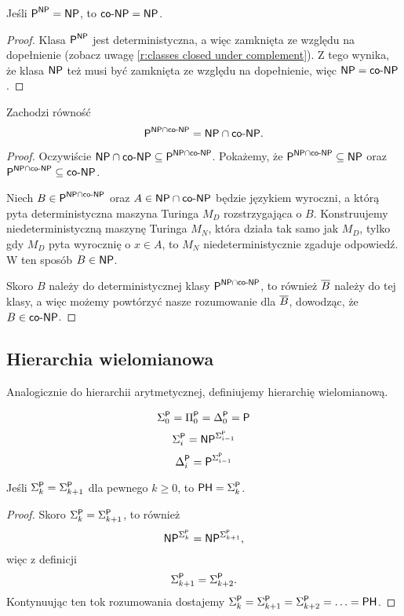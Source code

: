 \begin{fact}
    Jeśli $\textsf{P}^{\textsf{NP}} = \textsf{NP}$, to $\textsf{co-NP} = \textsf{NP}$.
\end{fact}
\begin{proof}
    Klasa $\textsf{P}^{\textsf{NP}}$ jest deterministyczna, a więc zamknięta ze względu na dopełnienie (zobacz uwagę \ref{r:classes closed under complement}). Z tego wynika, że klasa $\textsf{NP}$ też musi być zamknięta ze względu na dopełnienie, więc $\textsf{NP} = \textsf{co-NP}$.
\end{proof}

\begin{fact}
    Zachodzi równość
    \[ \textsf{P}^{\textsf{NP} \cap \textsf{co-NP}} = \textsf{NP} \cap \textsf{co-NP}. \]
\end{fact}
\begin{proof}
    Oczywiście $\textsf{NP} \cap \textsf{co-NP} \subseteq \textsf{P}^{\textsf{NP} \cap \textsf{co-NP}}$. Pokażemy, że $\textsf{P}^{\textsf{NP} \cap \textsf{co-NP}} \subseteq \textsf{NP}$ oraz $\textsf{P}^{\textsf{NP} \cap \textsf{co-NP}} \subseteq \textsf{co-NP}$.

    Niech $B \in \textsf{P}^{\textsf{NP} \cap \textsf{co-NP}}$ oraz $A \in \textsf{NP} \cap \textsf{co-NP}$ będzie językiem wyroczni, a którą pyta deterministyczna maszyna Turinga $M_D$ rozstrzygająca o $B$. Konstruujemy niedeterministyczną maszynę Turinga $M_N$, która działa tak samo jak $M_D$, tylko gdy $M_D$ pyta wyrocznię o $x \in A$, to $M_N$ niedeterministycznie zgaduje odpowiedź. W ten sposób $B \in \textsf{NP}$.

    Skoro $B$ należy do deterministycznej klasy $\textsf{P}^{\textsf{NP} \cap \textsf{co-NP}}$, to również $\overline{B}$ należy do tej klasy, a więc możemy powtórzyć nasze rozumowanie dla $\overline{B}$, dowodząc, że $B \in \textsf{co-NP}$.
\end{proof}

\subsection{Hierarchia wielomianowa}

Analogicznie do hierarchii arytmetycznej, definiujemy hierarchię wielomianową.

\begin{definition}
    \[ \Sigma_0^{\textsf{P}} = \Pi_0^{\textsf{P}} = \Delta_0^{\textsf{P}} = \textsf{P} \]
    \[ \Sigma_i^{\textsf{P}} = \textsf{NP}^{\Sigma_{i-1}^{\textsf{P}}} \]
    \[ \Delta_i^{\textsf{P}} = \textsf{P}^{\Sigma_{i-1}^{\textsf{P}}} \]
\end{definition}


\begin{theorem}
    Jeśli $\Sigma_k^{\textsf{P}} = \Sigma_{k+1}^{\textsf{P}}$ dla pewnego $k \geq 0$, to $\textsf{PH} = \Sigma_k^{\textsf{P}}$.
\end{theorem}
\begin{proof}
    Skoro $\Sigma_k^{\textsf{P}} = \Sigma_{k+1}^{\textsf{P}}$, to również
    \[ \textsf{NP}^{\Sigma_k^{\textsf{P}}} = \textsf{NP}^{\Sigma_{k+1}^{\textsf{P}}}, \]
    więc z definicji
    \[ \Sigma_{k+1}^{\textsf{P}} = \Sigma_{k+2}^{\textsf{P}}. \]
    Kontynuując ten tok rozumowania dostajemy $\Sigma_k^{\textsf{P}} = \Sigma_{k+1}^{\textsf{P}} = \Sigma_{k+2}^{\textsf{P}} = \ldots = \textsf{PH}$.
\end{proof}
